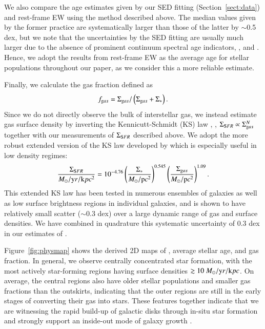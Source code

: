 We also compare the age estimates given by our SED fitting (Section~\ref{sect:data}) and \Hb rest-frame EW using the method
described above. The median values given by the former practice are systematically larger than those of the latter by $\sim$0.5
dex, but we note that the uncertainties by the SED fitting are usually much larger due to the absence of prominent continuum
spectral age indicators, \eg, \Dn and \HdA \citep{Kauffmann:2003cu}. Hence, we adopt the results from \Hb rest-frame EW as the
average age for stellar populations throughout our paper, as we consider this a more reliable estimate.

Finally, we calculate the gas fraction defined as
\begin{align}
    f_{\mathrm gas}=\Sigma_{\mathrm gas}/\left(\Sigma_{\mathrm gas}+\Sigma_\ast\right).
    \label{eq:fgas}
\end{align}
Since we do not directly observe the bulk of interstellar gas, we instead estimate gas surface density \Sgas by 
inverting the
Kennicutt-Schmidt (KS) law \citep{Schmidt:1959bp,Kennicutt:1998id}, \ie, $\Sigma_{{\mathrm SFR}}\propto\Sigma_{\mathrm gas}^{N}$ together with our
measurements of $\Sigma_{{\mathrm SFR}}$ described above.  We adopt the more robust extended version of the KS law developed by 
\citet{Shi:2011ck,Shi:2018wf} which is especially useful in low density regimes:
\begin{align}
    \frac{\Sigma_{{\mathrm SFR}}}{M_\odot/\mathrm yr/\mathrm kpc^2} = 10^{-4.76} \left(\frac{\Sigma_\ast}{M_\odot/\mathrm pc^2}\right)^{0.545}
    \left(\frac{\Sigma_{\mathrm gas}}{M_\odot/\mathrm pc^2}\right)^{1.09}.
    \label{eq:KSlaw}
\end{align}
This extended KS law has been tested in numerous ensembles of galaxies as well as low surface brightness regions in individual
galaxies, and is shown to have relatively small scatter ($\sim$0.3 dex) over a large dynamic range of gas and \SFR surface
densities. We have combined in quadrature this systematic uncertainty of 0.3 dex in our estimates of \Sgas.

Figure~\ref{fig:physmap} shows the derived 2D maps of \SFR, average stellar age, and gas fraction.
In general, we observe centrally concentrated star formation, with the most actively star-forming regions having surface densities 
$\gtrsim10~M_\odot/\mathrm yr/\mathrm kpc$.
On average, the central regions also have older stellar populations and smaller gas fractions than the outskirts, indicating that
the outer regions are still in the early stages of converting their gas into stars.
These features together indicate that we are witnessing the rapid build-up of galactic disks through in-situ star formation and 
strongly support an inside-out mode of galaxy growth \citep{Nelson:2014is,2013ApJ...765...48J}.

